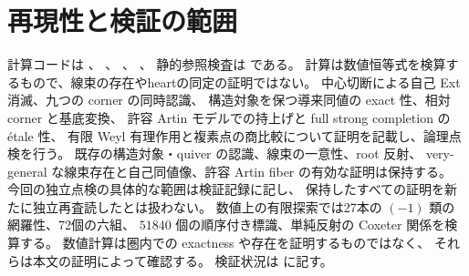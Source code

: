 \documentclass[11pt,a4paper]{ltjsarticle}
\theoremstyle{definition}\newtheorem{remark}[theorem]{注意}
\begin{document}
\section{再現性と検証の範囲}
計算コードは 、
、
、
、
静的参照検査は  である。
計算は数値恒等式を検算するもので、線束の存在やheartの同定の証明ではない。
中心切断による自己 Ext 消滅、九つの corner の同時認識、
構造対象を保つ導来同値の exact 性、相対 corner と基底変換、
許容 Artin モデルでの持上げと full strong completion の \'etale 性、
有限 Weyl 有理作用と複素点の商比較について証明を記載し、論理点検を行う。
既存の構造対象・quiver の認識、線束の一意性、root 反射、
very-general な線束存在と自己同値像、許容 Artin fiber の有効な証明は保持する。
今回の独立点検の具体的な範囲は検証記録に記し、
保持したすべての証明を新たに独立再査読したとは扱わない。
数値上の有限探索では27本の $(-1)$ 類の網羅性、72個の六組、
$51840$ 個の順序付き標識、単純反射の Coxeter 関係を検算する。
数値計算は圏内での exactness や存在を証明するものではなく、
それらは本文の証明によって確認する。
検証状況は  に記す。
\end{document}
